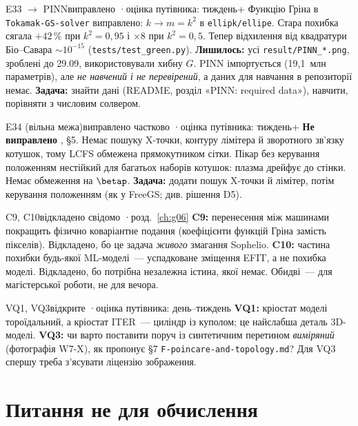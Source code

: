 \begin{itemcard}{E33 $\to$ PINN}{виправлено \quad·\quad оцінка путівника: тиждень+}
Функцію Гріна в \texttt{Tokamak-GS-solver} виправлено: $k\to m=k^2$ в \texttt{ellipk/ellipe}.
Стара похибка сягала $+42\,\%$ при $k^2=0{,}95$ і $\times8$ при $k^2=0{,}5$. Тепер відхилення від
квадратури Біо--Савара $\sim10^{-15}$ (\texttt{tests/test\_green.py}). \textbf{Лишилось:} усі
\texttt{result/PINN\_*.png}, зроблені до 29.09, використовували хибну $G$. PINN імпортується
(19,1~млн параметрів), але \emph{не навчений і не перевірений}, а даних для навчання в
репозиторії немає. \textbf{Задача:} знайти дані (README, розділ «PINN: required data»), навчити,
порівняти з числовим солвером.
\end{itemcard}

\begin{itemcard}{E34 (вільна межа)}{виправлено частково \quad·\quad оцінка путівника: тиждень+}
\textbf{Не виправлено} \cite{g04GSsolverChanges}, §5. Немає пошуку X-точки, контуру лімітера й
зворотного зв'язку котушок, тому LCFS обмежена прямокутником сітки. Пікар без керування
положенням нестійкий для багатьох наборів котушок: плазма дрейфує до стінки. Немає обмеження на
$\betap$. \textbf{Задача:} додати пошук X-точки й лімітер, потім керування положенням (як у
FreeGS; див. рішення D5).
\end{itemcard}

\begin{itemcard}{C9, C10}{відкладено свідомо \quad·\quad розд.~\ref{ch:g06}}
\textbf{C9:} перенесення між машинами покращить фізично коваріантне подання (коефіцієнти функцій
Гріна замість пікселів). Відкладено, бо це задача \emph{живого} змагання Sophelio.
\textbf{C10:} частина похибки будь-якої ML-моделі~--- успадковане зміщення EFIT, а не похибка
моделі. Відкладено, бо потрібна незалежна істина, якої немає. Обидві~--- для магістерської
роботи, не для вечора.
\end{itemcard}

\begin{itemcard}{VQ1, VQ3}{відкрите \quad·\quad оцінка путівника: день--тиждень}
\textbf{VQ1:} кріостат моделі тороїдальний, а кріостат ITER~--- циліндр із куполом; це найслабша
деталь 3D-моделі. \textbf{VQ3:} чи варто поставити поруч із синтетичним перетином
\emph{виміряний} (фотографія W7-X), як пропонує §7 \texttt{F-poincare-and-topology.md}? Для VQ3
спершу треба з'ясувати ліцензію зображення.
\end{itemcard}

\section{Питання не для обчислення}\label{sec:g10-questions}

